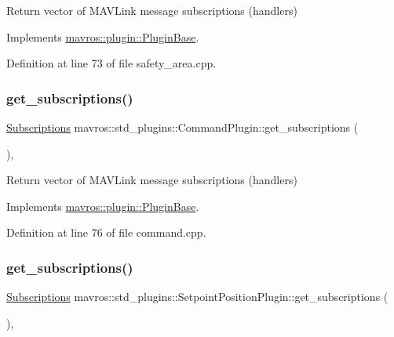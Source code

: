 Return vector of M\+A\+V\+Link message subscriptions (handlers) 



Implements \mbox{\hyperlink{group__plugin_gaf4e23fec6d7436a62cbf0942a2e5791c}{mavros\+::plugin\+::\+Plugin\+Base}}.



Definition at line 73 of file safety\+\_\+area.\+cpp.

\mbox{\label{group__plugin_ga359b17302f8aac303c17013d6fe7ea7f}} 
\subsubsection{\texorpdfstring{get\_subscriptions()}{get\_subscriptions()}\hspace{0.1cm}{\footnotesize\ttfamily [29/41]}}
{\footnotesize\ttfamily \mbox{\hyperlink{group__plugin_ga8967d61fc77040e0c3ea5a4585d62a09}{Subscriptions}} mavros\+::std\+\_\+plugins\+::\+Command\+Plugin\+::get\+\_\+subscriptions (\begin{DoxyParamCaption}{ }\end{DoxyParamCaption})\hspace{0.3cm}{\ttfamily [inline]}, {\ttfamily [virtual]}}



Return vector of M\+A\+V\+Link message subscriptions (handlers) 



Implements \mbox{\hyperlink{group__plugin_gaf4e23fec6d7436a62cbf0942a2e5791c}{mavros\+::plugin\+::\+Plugin\+Base}}.



Definition at line 76 of file command.\+cpp.

\mbox{\label{group__plugin_ga99aff69e854142f0373ec4acb5ac726d}} 
\subsubsection{\texorpdfstring{get\_subscriptions()}{get\_subscriptions()}\hspace{0.1cm}{\footnotesize\ttfamily [30/41]}}
{\footnotesize\ttfamily \mbox{\hyperlink{group__plugin_ga8967d61fc77040e0c3ea5a4585d62a09}{Subscriptions}} mavros\+::std\+\_\+plugins\+::\+Setpoint\+Position\+Plugin\+::get\+\_\+subscriptions (\begin{DoxyParamCaption}{ }\end{DoxyParamCaption})\hspace{0.3cm}{\ttfamily [inline]}, {\ttfamily [virtual]}}



